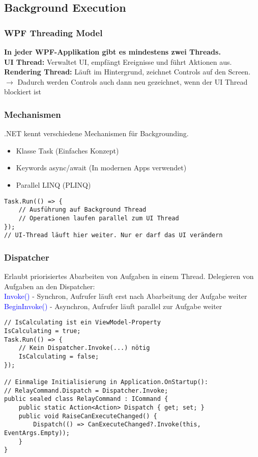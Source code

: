 \subsection{Background Execution}
\subsubsection{WPF Threading Model}
\textbf{In jeder WPF-Applikation gibt es mindestens zwei Threads.}\\
\textbf{UI Thread:} Verwaltet UI, empfängt Ereignisse und führt Aktionen aus.\\
\textbf{Rendering Thread:} Läuft im Hintergrund, zeichnet Controls auf den Screen.\\
$\rightarrow$ Dadurch werden Controls auch dann neu gezeichnet, wenn der UI Thread blockiert ist
\subsubsection{Mechanismen}
.NET kennt verschiedene Mechanismen für Backgrounding.
\begin{itemize}[topsep=0pt, leftmargin=4mm]
    \setlength\itemsep{-0.3em}
    \item Klasse Task (Einfaches Konzept)
    \item Keywords async/await (In modernen Apps verwendet)
    \item Parallel LINQ (PLINQ)
\end{itemize}
\begin{lstlisting}
Task.Run(() => {
    // Ausführung auf Background Thread
    // Operationen laufen parallel zum UI Thread
});
// UI-Thread läuft hier weiter. Nur er darf das UI verändern
\end{lstlisting}
\subsubsection{Dispatcher}
Erlaubt priorisiertes Abarbeiten von Aufgaben in einem Thread. Delegieren von Aufgaben an den Dispatcher:\\
\textcolor{blue}{Invoke()} - Synchron, Aufrufer läuft erst nach Abarbeitung der Aufgabe weiter\\
\textcolor{blue}{BeginInvoke()} - Asynchron, Aufrufer läuft parallel zur Aufgabe weiter
\begin{lstlisting}
// IsCalculating ist ein ViewModel-Property
IsCalculating = true;
Task.Run(() => {
    // Kein Dispatcher.Invoke(...) nötig
    IsCalculating = false;
});

// Einmalige Initialisierung in Application.OnStartup():
// RelayCommand.Dispatch = Dispatcher.Invoke;
public sealed class RelayCommand : ICommand {
    public static Action<Action> Dispatch { get; set; }
    public void RaiseCanExecuteChanged() {
        Dispatch(() => CanExecuteChanged?.Invoke(this, EventArgs.Empty));
    }
}
\end{lstlisting}